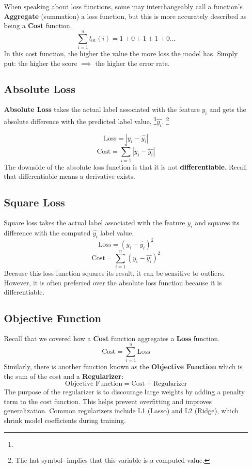 When speaking about loss functions, some may interchangeably call a function's \textbf{Aggregate} (summation) a loss function, but this is more accurately described as being a \textbf{Cost} function.
\[ 
\sum_{i=1}^{n} l_{01}(i) = 1 + 0 + 1 + 1 + 0 . . . 
\]
In this cost function, the higher the value the more loss the model has. Simply put: the higher the score $\implies$ the higher the error rate. 

\subsection{Absolute Loss}
\textbf{Absolute Loss} takes the actual label associated with the feature $y_i$ and gets the absolute difference with the predicted label value, \footnote{}$\hat{y_i}$.
\footnote[1]{The hat symbol $\hat{}$ implies that this variable is a computed value.}

\[ 
\text{Loss}=|y_i - \hat{y_i}|
\]
\[ 
\text{Cost}=\sum_{i=1}^{n} |y_i - \hat{y_i}|
\]
The downside of the absolute loss function is that it is not \textbf{differentiable}. Recall that differentiable means a derivative exists.

\subsection{Square Loss}
Square loss takes the actual label associated with the feature $y_i$ and squares its difference with the computed $\hat{y_i}$ label value.
\[ 
\text{Loss}=(y_i - \hat{y_i})^2
\]
\[ 
\text{Cost}=\sum_{i=1}^{n} (y_i - \hat{y_i})^2
\]
Because this loss function squares its result, it can be sensitive to outliers. However, it is often preferred over the absolute loss function because it is differentiable.

\subsection{Objective Function}
Recall that we covered how a \textbf{Cost} function aggregates a \textbf{Loss} function.
\[ 
\text{Cost}=\sum_{i=1}^{n} \text{Loss}
\]
Similarly, there is another function known as the \textbf{Objective Function} which is the sum of the cost and a \textbf{Regularizer}:
\[ 
\text{Objective Function}=\text{Cost} + \text{Regularizer}
\]
The purpose of the regularizer is to discourage large weights by adding a penalty term to the cost function. This helps prevent overfitting and improves generalization. Common regularizers include L1 (Lasso) \cite{tibshirani1996lasso} and L2 (Ridge), which shrink model coefficients during training.

